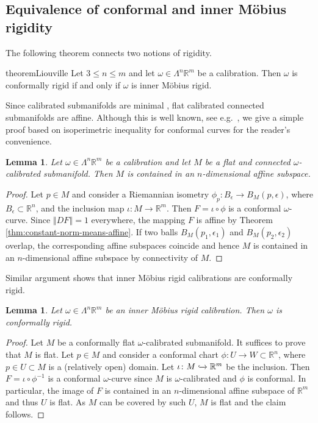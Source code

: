 \documentclass[a4paper,leqno,11pt]{amsart}
\numberwithin{equation}{section}
\newtheorem{lemma}[theorem]{Lemma}
\theoremstyle{remark}
\theoremstyle{remark}
\newcommand{\R}{\mathbb{R}}
\newcommand{\norm}[1]{ \left\Vert #1 \right\Vert }	%
\begin{document}
\subsection{Equivalence of conformal and inner M\"obius rigidity}
\label{sec:conformal-rigidity}


%
%
The following theorem connects two notions of rigidity.
\begin{restatable}{theorem}{Liouville}
\label{thm:Liouville}
Let $3 \le n \le m$ and let $\omega \in \Lambda^n \R^m$ be a calibration. Then $\omega$ is conformally rigid if and only if $\omega$ is inner M\"obius rigid.
\end{restatable}
%
%
Since calibrated submanifolds are minimal \cite{Har:Law:82}, flat calibrated connected submanifolds are affine. Although this is well known, see e.g.~\cite[Proposition 3.10]{Daj:Toj:19}, we give a simple proof based on isoperimetric inequality for conformal curves for the reader's convenience.
\begin{lemma}
\label{lemma:flat-is-affine}
Let $\omega \in \Lambda^n \R^m$ be a calibration and let $M$ be a flat and connected $\omega$-calibrated submanifold. Then $M$ is contained in an $n$-dimensional affine subspace.
\end{lemma}
\begin{proof}
Let $p \in M$ and consider a Riemannian isometry $\phi_p \colon B_{\epsilon} \rightarrow B_{M}( p, \epsilon )$, where $B_\epsilon \subset \R^n$, and the inclusion map $\iota \colon M \rightarrow \mathbb{R}^m$. Then $F = \iota \circ \phi$ is a conformal $\omega$-curve. Since $\norm{DF}=1$ everywhere, the mapping $F$ is affine by Theorem \ref{thm:constant-norm-means-affine}. If two balls $B_M( p_1, \epsilon_1 )$ and $B_M( p_2, \epsilon_2 )$ overlap, the corresponding affine subspaces coincide and hence $M$ is contained in an $n$-dimensional affine subspace by connectivity of $M$.
\end{proof}

Similar argument shows that inner M\"obius rigid calibrations are conformally rigid.
\begin{lemma}\label{lemma:mob:to:conf:rigid}
Let $\omega \in \Lambda^n \mathbb{R}^m$ be an inner Möbius rigid calibration. Then $\omega$ is conformally rigid.
\end{lemma}
\begin{proof}
Let $M$ be a conformally flat $\omega$-calibrated submanifold. It suffices to prove that $M$ is flat. Let $p \in M$ and consider a conformal chart $\phi \colon U \to W \subset \mathbb{R}^n$, where $p \in U \subset M$ is a (relatively open) domain. Let $\iota \colon M \xhookrightarrow{} \mathbb{R}^m$ be the inclusion. Then $F = \iota \circ \phi^{-1}$ is a conformal $\omega$-curve since $M$ is $\omega$-calibrated and $\phi$ is conformal. In particular, the image of $F$ is contained in an $n$-dimensional affine subspace of $\mathbb{R}^m$ and thus $U$ is flat. As $M$ can be covered by such $U$, $M$ is flat and the claim follows.
\end{proof}
\end{document}
